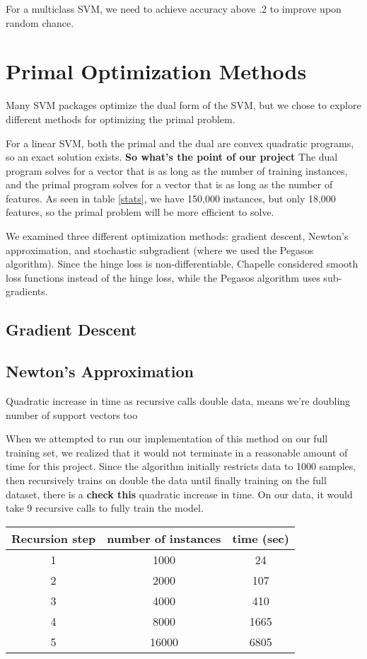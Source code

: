 \documentclass[letterpaper, 11pt]{article}
\begin{document}
For a multiclass SVM, we need to achieve accuracy above .2 to improve upon random chance.

\section{Primal Optimization Methods}
Many SVM packages optimize the dual form of the SVM, but we chose to explore different methods for optimizing the primal problem.

For a linear SVM, both the primal and the dual are convex quadratic programs, so an exact solution exists.  \textbf{So what's the point of our project}  The  dual program solves for a vector that is as long as the number of training instances, and the primal program solves for a vector that is as long as the number of features.  As seen in table \ref{stats}, we have 150,000 instances, but only 18,000 features, so the primal problem will be more efficient to solve.

We examined three different optimization methods: gradient descent, Newton's approximation, and stochastic subgradient (where we used the Pegasos algorithm).  Since the hinge loss is non-differentiable, Chapelle considered smooth loss functions instead of the hinge loss\cite{chapelle2007training}, while the Pegasos algorithm\cite{pegasos} uses sub-gradients.

\subsection{Gradient Descent}

\subsection{Newton's Approximation}

Quadratic increase in time as recursive calls double data, means we're doubling number of support vectors too

When we attempted to run our implementation of this method on our full training set, we realized that it would not terminate in a reasonable amount of time for this project.  Since the algorithm initially restricts data to 1000 samples, then recursively trains on double the data until finally training on the full dataset, there is a \textbf{check this} quadratic increase in time.  On our data, it would take 9 recursive calls to fully train the model.

\begin{table}
\centering
\begin{tabular}{c|cc}
Recursion step & number of instances & time (sec)\\
\hline
1 & 1000 & 24\\
2 & 2000 & 107\\
3 & 4000 & 410\\
4 & 8000 & 1665\\
5 & 16000 & 6805\\
\end{tabular}
\end{table}
\end{document}
